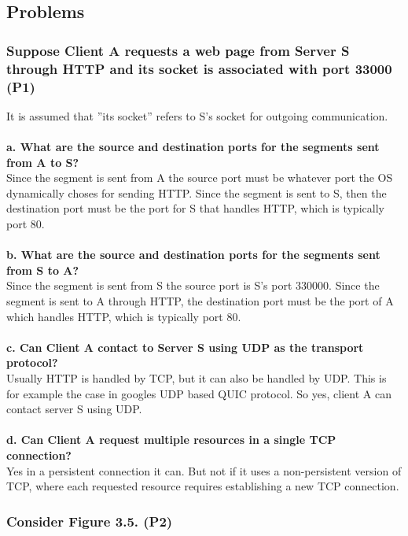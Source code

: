 

\subsection{Problems}


\subsubsection{Suppose Client A requests a web page from Server S through HTTP and its socket is associated with port 33000 (P1)}
It is assumed that ''its socket'' refers to S's socket for outgoing communication. \\
\\
\textbf{a. What are the source and destination ports for the segments sent from A to S?} \\
Since the segment is sent from A the source port must be whatever port the OS dynamically choses for sending HTTP. Since the segment is sent to S, then the destination port must be the port for S that handles HTTP, which is typically port 80. \\
\\
\textbf{b. What are the source and destination ports for the segments sent from S to A?} \\
Since the segment is sent from S the source port is S's port 330000. Since the segment is sent to A through HTTP, the destination port must be the port of A which handles HTTP, which is typically port 80. \\
\\ 
\textbf{c. Can Client A contact to Server S using UDP as the transport protocol?} \\
Usually HTTP is handled by TCP, but it can also be handled by UDP. This is for example the case in googles UDP based QUIC protocol. So yes, client A can contact server S using UDP.\\
\\
\textbf{d. Can Client A request multiple resources in a single TCP connection?} \\
Yes in a persistent connection it can. But not if it uses a non-persistent version of TCP, where each requested resource requires establishing a new TCP connection.


\subsubsection{Consider Figure 3.5. (P2)}

